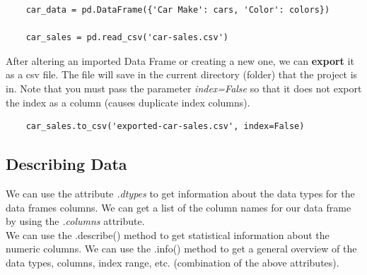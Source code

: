 \documentclass[11pt, a4paper]{article}
\begin{document}
\begin{spacing}{1.1}
\begin{lstlisting}
	car_data = pd.DataFrame({'Car Make': cars, 'Color': colors})
	
	car_sales = pd.read_csv('car-sales.csv') \end{lstlisting} \vspace*{1mm} 
	After altering an imported Data Frame or creating a new one, we can \textbf{export} it as a csv file. The file will save in the current directory (folder) that the project is in. Note that you must pass the parameter \textit{index=False} so that it does not export the index as a column (causes duplicate index columns).
	\begin{lstlisting}
	car_sales.to_csv('exported-car-sales.csv', index=False) \end{lstlisting} \vspace*{1mm} 
	\subsection{Describing Data}
	We can use the attribute \textit{.dtypes} to get information about the data types for the data frames columns. We can get a list of the column names for our data frame by using the \textit{.columns} attribute. \vspace*{1.5mm}\\
	We can use the .describe() method to get statistical information about the numeric columns. We can use the .info() method to get a general overview of the data types, columns, index range, etc. (combination of the above attributes). \newpage


\end{spacing}
\end{document}
